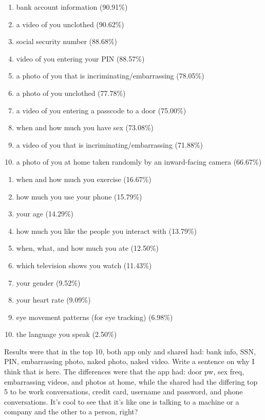 \documentclass{acm_proc_article-sp}
\begin{document}
\begin{enumerate} \itemsep1pt \parskip0pt 
  \item bank account information (90.91\%)
  \item a video of you unclothed (90.62\%)
  \item social security number (88.68\%)
  \item video of you entering your PIN (88.57\%)
  \item a photo of you that is incriminating/embarrassing (78.05\%)
  \item a photo of you unclothed (77.78\%)
  \item a video of you entering a passcode to a door (75.00\%)
  \item when and how much you have sex (73.08\%)
  \item a video of you that is incriminating/embarrassing (71.88\%)
  \item a photo of you at home taken randomly by an inward-facing camera (66.67\%)  \\[-.8cm]
\end{enumerate}

\begin{enumerate} \itemsep1pt \parskip0pt 
  \setcounter{enumi}{63}
  \item when and how much you exercise (16.67\%)
  \item how much you use your phone (15.79\%)
  \item your age (14.29\%)
  \item how much you like the people you interact with (13.79\%)
  \item when, what, and how much you ate (12.50\%)
  \item which television shows you watch (11.43\%)
  \item your gender (9.52\%)
  \item your heart rate (9.09\%)
  \item eye movement patterns (for eye tracking) (6.98\%)
  \item the language you speak (2.50\%)\\[-.8cm]
\end{enumerate}

Results were that in the top 10, both app only and shared had: bank info, SSN, PIN, embarrassing photo, naked photo, naked video. Write a sentence on why I think that is here. The differences were that the app had: door pw, sex freq, embarrassing videos, and photos at home, while the shared had the differing top 5 to be work conversations, credit card, username and password,  and phone conversations. It's cool to see that it's like one is talking to a machine or a company and the other to a person, right? 
\end{document}
